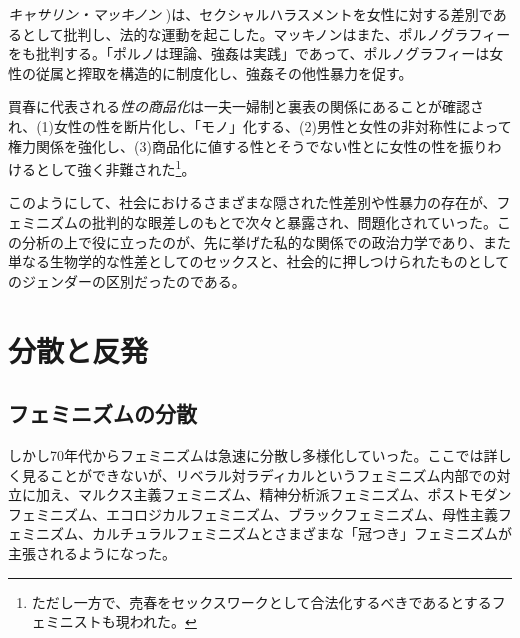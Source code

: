 \documentclass[dvipdfmx,uplatex]{jsarticle}
\begin{document}
\emph{キャサリン・マッキノン}\citep{mackinnon79:_sexual_haras_of_workin_women} )は、セクシャルハラスメントを女性に対する差別であるとして批判し、法的な運動を起こした。マッキノンはまた、ポルノグラフィーをも批判する\citep{mackinnon93:_only_words}。「ポルノは理論、強姦は実践」であって、ポルノグラフィーは女性の従属と搾取を構造的に制度化し、強姦その他性暴力を促す。

買春に代表される\emph{性の商品化}は一夫一婦制と裏表の関係にあることが確認され、(1)女性の性を断片化し、「モノ」化する、(2)男性と女性の非対称性によって権力関係を強化し、(3)商品化に値する性とそうでない性とに女性の性を振りわけるとして強く非難された\footnote{ただし一方で、売春をセックスワークとして合法化するべきであるとするフェミニストも現われた。}。

このようにして、社会におけるさまざまな隠された性差別や性暴力の存在が、フェミニズムの批判的な眼差しのもとで次々と暴露され、問題化されていった。この分析の上で役に立ったのが、先に挙げた私的な関係での政治力学であり、また単なる生物学的な性差としてのセックスと、社会的に押しつけられたものとしてのジェンダーの区別だったのである。


\section{分散と反発}

\subsection{フェミニズムの分散}

しかし70年代からフェミニズムは急速に分散し多様化していった。ここでは詳しく見ることができないが、リベラル対ラディカルというフェミニズム内部での対立に加え、マルクス主義フェミニズム、精神分析派フェミニズム、ポストモダンフェミニズム、エコロジカルフェミニズム、ブラックフェミニズム、母性主義フェミニズム、カルチュラルフェミニズムとさまざまな「冠つき」フェミニズムが主張されるようになった。


\end{document}
